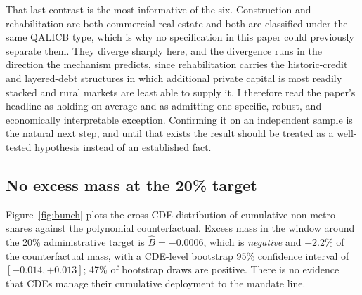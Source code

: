 That last contrast is the most informative of the six. Construction and
rehabilitation are both commercial real estate and both are classified
under the same QALICB type, which is why no specification in this paper
could previously separate them. They diverge sharply here, and the
divergence runs in the direction the mechanism predicts, since
rehabilitation carries the historic-credit and layered-debt structures in
which additional private capital is most readily stacked and rural markets
are least able to supply it. I therefore read the paper's headline as
holding on average and as admitting one specific, robust, and economically
interpretable exception. Confirming it on an independent sample is the
natural next step, and until that exists the result should be treated as a
well-tested hypothesis instead of an established fact.

\begin{table}[!htbp]
\centering
\caption{Attempts to break the commercial real-estate rehabilitation cell.
The baseline is the workhorse specification estimated inside that cell,
with year, QALICB-type and CDE fixed effects and CDE-clustered standard
errors. Randomization inference permutes rural within intermediary; the
wild cluster bootstrap-$t$ imposes the null and uses Rademacher weights.}
\label{tab:rehab}

\end{table}

\begin{table}[t]
\centering
\caption{The within-CDE rural coefficient inside subgroups. Each cell
repeats the workhorse specification with year, QALICB-type and CDE fixed
effects and CDE-clustered standard errors. The final column reports whether
the cell survives a Benjamini-Hochberg correction at the 5\% level across
all twenty estimated cells.}
\label{tab:residual}

\end{table}

\subsection{No excess mass at the 20\% target}\label{sec:bunching}

Figure~\ref{fig:bunch} plots the cross-CDE distribution of cumulative
non-metro shares against the polynomial counterfactual. Excess mass in the
window around the 20\% administrative target is $\hat B = -0.0006$, which is
\emph{negative} and $-2.2\%$ of the counterfactual mass, with a CDE-level
bootstrap 95\% confidence interval of $[-0.014, +0.013]$; 47\% of bootstrap
draws are positive. There is no evidence that CDEs manage their cumulative
deployment to the mandate line.

